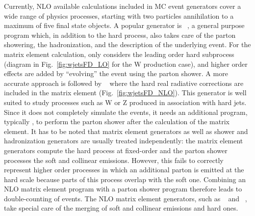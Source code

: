 Currently, NLO available calculations included in MC event generators cover a wide range of physics processes, starting with two particles annihilation to a maximum of five final state objects.
A popular generator is \PYTHIA{}~\cite{Sjostrand:2007gs,Sjostrand:2006za}, a general purpose program which, in addition to the hard process, also takes care of the parton showering, the hadronization, and the description of the underlying event.
For the matrix element calculation, \PYTHIA{} only considers the leading order hard subprocess (diagram in Fig.~\ref{fig:wjetsFD_LO} for the W production case), and higher
order effects are added by ``evolving'' the event using the parton shower.
A more accurate approach is followed by \MADGRAPH{}~\cite{Alwall:2011uj} where the hard real radiative
corrections are included in the matrix element (Fig.~\ref{fig:wjetsFD_NLO}). %
This generator is well suited to study processes such as W or Z produced in association with hard jets.
Since it does not completely simulate the events, it needs an additional program, typically \PYTHIA{}, to perform the parton shower after the calculation of the matrix element.
It has to be noted that matrix element generators as well as shower and hadronization generators are usually treated independently: the matrix element generators compute the hard process at fixed-order and the parton shower processes the soft and collinear emissions. However, this fails to correctly represent higher order processes in which an additional parton is emitted at the hard scale because parts of this process overlap with the soft one. Combining an NLO matrix element program with a parton shower program therefore leads to double-counting of events. The NLO matrix element generators, such as \POWHEG{}~\cite{Frixione:2007vw} and \MCATNLO{}~\cite{Frixione:2003ei}, take special care of the merging of soft and collinear emissions and hard ones.

